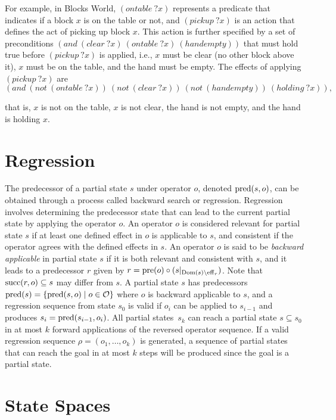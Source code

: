 \documentclass[ppgc,diss,english]{iiufrgs}
\begin{document}
For example, in Blocks World, $(ontable~?x)$ represents a predicate that indicates if a block $x$ is on the table or not, and $(pickup~?x)$ is an action that defines the act of picking up block $x$. This action is further specified by a set of preconditions $(and~(clear~?x)~(ontable~?x)~(handempty))$ that must hold true before $(pickup~?x)$ is applied, i.e., $x$ must be clear (no other block above it), $x$ must be on the table, and the hand must be empty. The effects of applying $(pickup~?x)$ are $$(and~(not~(ontable~?x))~(not~(clear~?x))~(not~(handempty))~(holding~?x)),$$

that is, $x$ is not on the table, $x$ is not clear, the hand is not empty, and the hand is holding $x$.

\section{Regression}
The predecessor of a partial state $s$ under operator $o$, denoted $\operatorname{pred}(s,o)$, can be obtained through a process called backward search or regression. Regression involves determining the predecessor state that can lead to the current partial state by applying the operator $o$. An operator $o$ is considered relevant for partial state $s$ if at least one defined effect in $o$ is applicable to $s$, and consistent if the operator agrees with the defined effects in $s$. An operator $o$ is said to be \emph{backward applicable} in partial state $s$ if it is both relevant and consistent with $s$, and it leads to a predecessor $r$ given by $r=\operatorname{pre}(o)\circ (s|_{\operatorname{Dom}(s)\setminus\operatorname{eff}_r})$. Note that $\operatorname{succ}(r,o)\subseteq s$ may differ from $s$.
A partial state $s$ has predecessors $\operatorname{pred}(s)=\{{\operatorname{pred}(s,o)\mid o\in \mathcal{O}}\}$ where $o$ is backward applicable to $s$, and a regression sequence from state $s_0$ is valid if $o_i$ can be applied to $s_{i-1}$ and produces $s_i=\operatorname{pred}(s_{i-1},o_i)$. All partial states~$s_k$ can reach a partial state $s\subseteq s_0$ in at most $k$ forward applications of the reversed operator sequence.
If a valid regression sequence $\rho=(o_1,\ldots,o_k)$ is generated, a sequence of partial states that can reach the goal in at most $k$ steps will be produced since the goal is a partial state.



\section{State Spaces}
\label{background-state-spaces}
\end{document}
